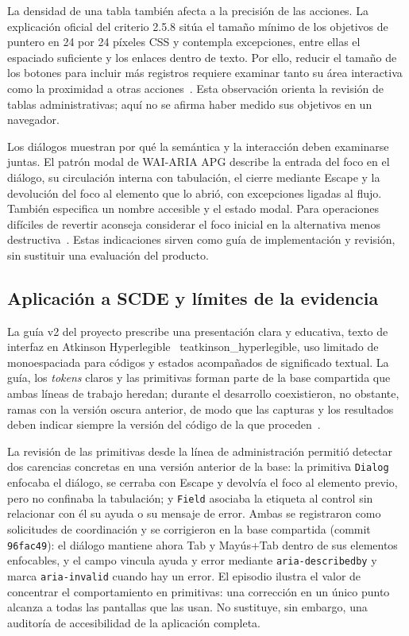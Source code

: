 La densidad de una tabla también afecta a la precisión de las acciones. La
explicación oficial del criterio 2.5.8 sitúa el tamaño mínimo de los objetivos de
puntero en 24 por 24 píxeles CSS y contempla excepciones, entre ellas el
espaciado suficiente y los enlaces dentro de texto. Por ello, reducir el tamaño
de los botones para incluir más registros requiere examinar tanto su área
interactiva como la proximidad a otras acciones~\cite{codex_wcag_target_size}.
Esta observación orienta la revisión de tablas administrativas; aquí no se afirma
haber medido sus objetivos en un navegador.

Los diálogos muestran por qué la semántica y la interacción deben examinarse
juntas. El patrón modal de WAI-ARIA APG describe la entrada del foco en el
diálogo, su circulación interna con tabulación, el cierre mediante Escape y la
devolución del foco al elemento que lo abrió, con excepciones ligadas al flujo.
También especifica un nombre accesible y el estado modal. Para operaciones
difíciles de revertir aconseja considerar el foco inicial en la alternativa menos
destructiva~\cite{codex_apg_modal_dialog}. Estas indicaciones sirven como guía
de implementación y revisión, sin sustituir una evaluación del producto.

\subsection{Aplicación a SCDE y límites de la evidencia}

La guía v2 del proyecto prescribe una presentación clara y educativa, texto de
interfaz en Atkinson Hyperlegible~	te{atkinson_hyperlegible}, uso limitado de monoespaciada para códigos y
estados acompañados de significado textual. La guía, los \textit{tokens} claros
y las primitivas forman parte de la base compartida que ambas líneas de trabajo
heredan; durante el desarrollo coexistieron, no obstante, ramas con la versión
oscura anterior, de modo que las capturas y los resultados deben indicar siempre
la versión del código de la que proceden~\cite{codex_scde_design_evidence}.

La revisión de las primitivas desde la línea de administración permitió
detectar dos carencias concretas en una versión anterior de la base: la primitiva
\texttt{Dialog} enfocaba el diálogo, se cerraba con Escape y devolvía el foco al
elemento previo, pero no confinaba la tabulación; y \texttt{Field} asociaba la
etiqueta al control sin relacionar con él su ayuda o su mensaje de error. Ambas
se registraron como solicitudes de coordinación y se corrigieron en la base
compartida (commit \texttt{96fac49}): el diálogo mantiene ahora Tab y
Mayús+Tab dentro de sus elementos enfocables, y el campo vincula ayuda y error
mediante \texttt{aria-describedby} y marca \texttt{aria-invalid} cuando hay un
error. El episodio ilustra el valor de concentrar el comportamiento en
primitivas: una corrección en un único punto alcanza a todas las pantallas que
las usan. No sustituye, sin embargo, una auditoría de accesibilidad de la
aplicación completa.

